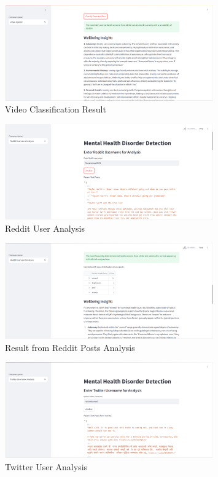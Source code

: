 \begin{figure}[h!]  
    \centering
    \includegraphics[width=0.8\textwidth]{App Images/13 Interface.png}  
    \caption{Video Classification Result}
    \label{06i}  %
\end{figure}

\begin{figure}[h!]  
    \centering
    \includegraphics[width=0.8\textwidth]{App Images/06 Interface.png}  
    \caption{Reddit User Analysis}
    \label{07i}  %
\end{figure}

\begin{figure}[h!]  
    \centering
    \includegraphics[width=0.8\textwidth]{App Images/07 Interface.png}  
    \caption{Result from Reddit Posts Analysis}
    \label{08i}  %
\end{figure}

\pagebreak

\begin{figure}[h!]  
    \centering
    \includegraphics[width=0.8\textwidth]{App Images/08 Interface.png}  
    \caption{Twitter User Analysis}
    \label{09i}  %
\end{figure}

